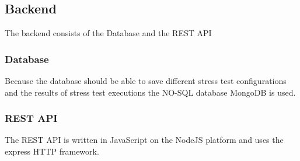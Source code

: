 \subsection{Backend}
The backend consists of the Database and the REST API

\subsubsection{Database}
Because the database should be able to save different stress test configurations and the results of stress test executions the NO-SQL database MongoDB is used.

\subsubsection{REST API}
The REST API is written in JavaScript on the NodeJS platform and uses the express HTTP framework.
